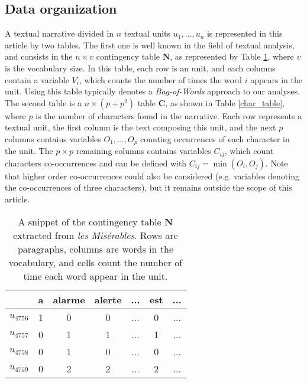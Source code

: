 \documentclass[
twocolumn,
]{ceurart}
\begin{document}
\subsection{Data organization}

A textual narrative divided in $n$ textual units $u_1, \ldots, u_n$ is represented in this article by two tables. The first one is well known in the field of textual analysis, and consists in the $n \times v$ contingency table $\mathbf{N}$, as represented by Table \ref{cont_table}, where $v$ is the vocabulary size. In this table, each row is an unit, and each columns contain a variable $V_i$, which counts the number of times the word $i$ appears in the unit. Using this table typically denotes a \emph{Bag-of-Words} approach to our analyses. \\
The second table is a $n \times (p + p^2)$ table $\mathbf{C}$, as shown in Table \ref{char_table}, where $p$ is the number of characters found in the narrative. Each row represents a textual unit, the first column is the text composing this unit, and the next $p$ columns contains variables $O_1, \ldots, O_p$ counting occurrences of each character in the unit. The $p \times p$ remaining columns contains variables $C_{ij}$, which count characters co-occurrences and can be defined with $C_{ij} = \min(O_i, O_j)$. Note that higher order co-occurrences could also be considered (e.g. variables denoting the co-occurrences of three characters), but it remains outside the scope of this article. \\


\begin{table}[h]
	\scriptsize
	\begin{tabular}{|c||c|c|c|c|c|c|}
		\hline
		& a & alarme & alerte & ... & est & ... \\
		\hline
		\hline 
		$u_{4756}$ & 1 & 0 & 0 & ... & 0 & ... \\
		\hline
		$u_{4757}$ & 0 & 1 & 1 & ... & 1 & ... \\
		\hline
		$u_{4758}$ & 0 & 1 & 0 & ... & 0 & ... \\
		\hline
		$u_{4759}$ & 0 & 2 & 2 & ... & 2 & ... \\
		\hline
	\end{tabular}
	\label{cont_table}
	\caption{A snippet of the contingency table $\mathbf{N}$ extracted from \emph{les Misérables}. Rows are paragraphs, columns are words in the vocabulary, and cells count the number of time each word appear in the unit.}
\end{table}
\end{document}
